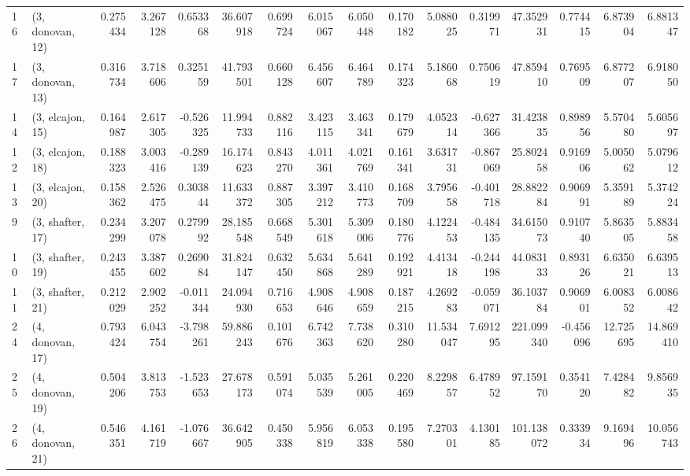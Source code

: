 \begin{tabular}{llrrrrrrrrrrrrrr}
16 &  (3, donovan, 12) &   0.275434 &  3.267128 &  0.653368 &  36.607918 &  0.699724 &   6.015067 &  6.050448 &  0.170182 &   5.088025 &  0.319971 &   47.352931 &  0.774415 &   6.873904 &   6.881347 \\
17 &  (3, donovan, 13) &   0.316734 &  3.718606 &  0.325159 &  41.793501 &  0.660128 &   6.456607 &  6.464789 &  0.174323 &   5.186068 &  0.750619 &   47.859410 &  0.769509 &   6.877207 &   6.918050 \\
14 &  (3, elcajon, 15) &   0.164987 &  2.617305 & -0.526325 &  11.994733 &  0.882116 &   3.423115 &  3.463341 &  0.179679 &   4.052314 & -0.627366 &   31.423835 &  0.898956 &   5.570480 &   5.605697 \\
12 &  (3, elcajon, 18) &   0.188323 &  3.003416 & -0.289139 &  16.174623 &  0.843270 &   4.011361 &  4.021769 &  0.161341 &   3.631731 & -0.867069 &   25.802458 &  0.916906 &   5.005062 &   5.079612 \\
13 &  (3, elcajon, 20) &   0.158362 &  2.526475 &  0.303844 &  11.633372 &  0.887305 &   3.397212 &  3.410773 &  0.168709 &   3.795658 & -0.401718 &   28.882284 &  0.906991 &   5.359189 &   5.374224 \\
9  &  (3, shafter, 17) &   0.234299 &  3.207078 &  0.279992 &  28.185548 &  0.668549 &   5.301618 &  5.309006 &  0.180776 &   4.122453 & -0.484135 &   34.615073 &  0.910740 &   5.863505 &   5.883458 \\
10 &  (3, shafter, 19) &   0.243455 &  3.387602 &  0.269084 &  31.824147 &  0.632450 &   5.634868 &  5.641289 &  0.192921 &   4.413418 & -0.244198 &   44.083133 &  0.893126 &   6.635021 &   6.639513 \\
11 &  (3, shafter, 21) &   0.212029 &  2.902252 & -0.011344 &  24.094930 &  0.716653 &   4.908646 &  4.908659 &  0.187215 &   4.269283 & -0.059071 &   36.103784 &  0.906901 &   6.008352 &   6.008642 \\
24 &  (4, donovan, 17) &   0.793424 &  6.043754 & -3.798261 &  59.886243 &  0.101676 &   6.742363 &  7.738620 &  0.310280 &  11.534047 &  7.691295 &  221.099340 & -0.456096 &  12.725695 &  14.869410 \\
25 &  (4, donovan, 19) &   0.504206 &  3.813753 & -1.523653 &  27.678173 &  0.591074 &   5.035539 &  5.261005 &  0.220469 &   8.229857 &  6.478952 &   97.159170 &  0.354120 &   7.428482 &   9.856935 \\
26 &  (4, donovan, 21) &   0.546351 &  4.161719 & -1.076667 &  36.642905 &  0.450338 &   5.956819 &  6.053338 &  0.195580 &   7.270301 &  4.130185 &  101.138072 &  0.333934 &   9.169496 &  10.056743 \\

\end{tabular}
